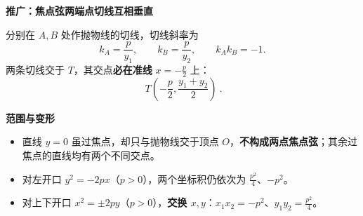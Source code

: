 \begin{statementbox}

\medskip
\textbf{\textcolor{CStatement}{推广：焦点弦两端点切线互相垂直}}\par\smallskip
\begin{center}\end{center}
分别在 $A,B$ 处作抛物线的切线，切线斜率为
\[
 k_A=\frac{p}{y_1},\qquad k_B=\frac{p}{y_2},\qquad
 \boxed{k_Ak_B=-1}.
\]
两条切线交于 $T$，其交点\textbf{必在准线} $x=-\frac p2$ 上：
\[
 \boxed{\ T\!\left(-\frac p2,\frac{y_1+y_2}{2}\right)\ }.
\]

\medskip
\textbf{\textcolor{CStatement}{范围与变形}}\par\smallskip
\begin{itemize}[leftmargin=*,itemsep=0.2em]
 \item 直线 $y=0$ 虽过焦点，却只与抛物线交于顶点 $O$，\textbf{不构成两点焦点弦}；其余过焦点的直线均有两个不同交点。
 \item 对左开口 $y^2=-2px$（$p>0$），两个坐标积仍依次为 $\frac{p^2}{4}$、$-p^2$。
 \item 对上下开口 $x^2=\pm2py$（$p>0$），\textbf{交换 $x,y$}：$x_1x_2=-p^2$、$y_1y_2=\frac{p^2}{4}$。
\end{itemize}
\end{statementbox}
